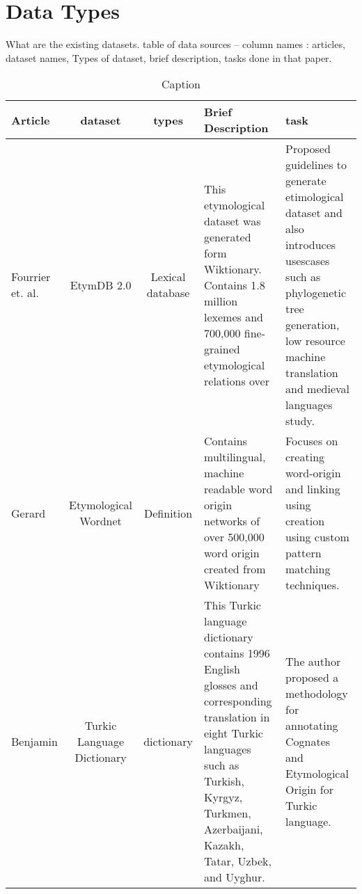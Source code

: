 \section{Data Types}
What are the existing datasets. 
table of data sources -- column names : articles, dataset names, Types of dataset, brief description, tasks done in that paper.


\begin{table}[]
    \centering
    \begin{tabular}{|p{1cm}|c|c|p{4cm}|p{3cm}|}\hline
    Article & dataset & types & Brief Description & task\\ \hline
        Fourrier et. al. \cite{fourrier_methodological_2020} & EtymDB 2.0 & Lexical database & This etymological dataset was generated form Wiktionary. Contains 1.8 million lexemes and 700,000 fine-grained etymological relations over  &  Proposed guidelines to generate etimological dataset and also introduces usescases such as phylogenetic tree generation, low resource
machine translation and medieval languages study. \\ \hline
Gerard \cite{demelo_etymological_2014}& Etymological Wordnet & Definition & Contains multilingual, machine readable word origin networks of over  500,000 word origin created from Wiktionary & Focuses on creating word-origin and linking using creation using custom pattern matching techniques. \\ \hline

Benjamin \cite{mericli_annotating_2015}& Turkic Language Dictionary & dictionary & This Turkic language dictionary contains 1996 English glosses and corresponding translation in eight Turkic languages such as  Turkish, Kyrgyz, Turkmen, Azerbaijani, Kazakh, Tatar, 
 Uzbek, and Uyghur. & The author proposed a methodology for annotating Cognates and Etymological Origin for Turkic language.\\ \hline
    \end{tabular}
    \caption{Caption}
    \label{tab:my_label}
\end{table}